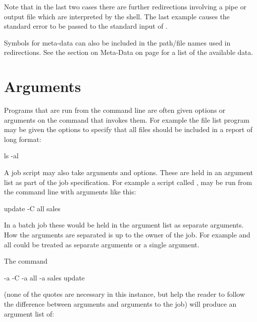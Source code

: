 Note that in the last two cases there are further redirections involving a pipe or output file which are interpreted by the shell. The last
example causes the standard error to be passed to the standard input of .

Symbols for meta-data can also be included in the path/file names used in redirections.
See the section on Meta-Data on page \pageref{bkm:Metadata} for a list of the available data.

\section{Arguments}
Programs that are run from the command line are often given options or arguments on the command that invokes them. For example the file list
program  may be given the options  to specify that all files should be included in a report of long format:

\begin{expara}

ls -al

\end{expara}

A job script may also take arguments and options. These are held in an argument list as part of the job specification. For example a script
called , may be run from the command line with arguments like this:

\begin{expara}

update -C all sales

\end{expara}

In a batch job these would be held in the argument list as separate arguments. How the arguments are separated is up to the owner of the
job. For example  and all could be treated as separate arguments or a single argument.

The \PrBtr{} command

\begin{expara}

\BtrName{} -a {\textquotesingle}-C{\textquotesingle} -a {\textquotesingle}all{\textquotesingle} -a {\textquotesingle}sales{\textquotesingle} update

\end{expara}

(none of the quotes are necessary in this instance, but help the reader to follow the difference between \PrBtr{} arguments
and arguments to the job) will produce an argument list of:

